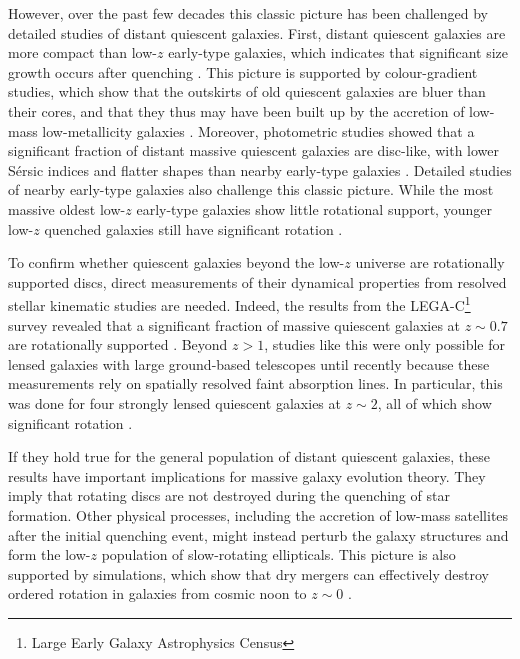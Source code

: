 \documentclass{aa}
\begin{document}
However, over the past few decades this classic picture has been challenged by detailed studies of distant quiescent galaxies. First, distant quiescent galaxies are more compact than low-$z$ early-type galaxies, which indicates that significant size growth occurs after quenching \citep[e.g.][]{EDaddi2005, PvanDokkum2008, AvanderWel2014, KSuess2021}. This picture is supported by colour-gradient studies, which show that the outskirts of old quiescent galaxies are bluer than their cores, and that they thus may have been built up by the accretion of low-mass low-metallicity galaxies \citep[e.g.][]{JGreene2015, IMartinNavarro2018, KSuess2019, Cheng_2024}. Moreover, photometric studies showed that a significant fraction of distant massive quiescent galaxies are disc-like, with lower S\'ersic indices and flatter shapes than nearby early-type galaxies \citep{EMcGrath2008, PvanDokkum2008, AvanderWel2011, RMcClure2013, VBruce2012, VBruce2014, FBuitrago2013, YChang2013a, YChang2013b}. Detailed studies of nearby early-type galaxies also challenge this classic picture. While the most massive oldest low-$z$ early-type galaxies show little rotational support, younger low-$z$ quenched galaxies still have significant rotation \citep[e.g.][]{JvandeSande2017, JVandeSande2018, SCroom2024}.

To confirm whether quiescent galaxies beyond the low-$z$ universe are rotationally supported discs, direct measurements of their dynamical properties from resolved stellar kinematic studies are needed. Indeed, the results from the LEGA-C\footnote{Large Early Galaxy Astrophysics Census} survey revealed that a significant fraction of massive quiescent galaxies at $z\sim0.7$ are rotationally supported \citep{RBezanson2018, JvanHoudt2021}. 
Beyond $z>1$, studies like this were only possible for lensed galaxies with large ground-based telescopes until recently because these measurements rely on spatially resolved faint absorption lines. In particular, this was done for four strongly lensed quiescent galaxies at $z\sim2$, all of which show significant rotation \citep{ANewman2015, ANewman2018b, SToft2017}.

If they hold true for the general population of distant quiescent galaxies, these results have important implications for massive galaxy evolution theory. They imply that rotating discs are not destroyed during the quenching of star formation. Other physical processes, including the accretion of low-mass satellites after the initial quenching event, might instead perturb the galaxy structures and form the low-$z$ population of slow-rotating ellipticals. This picture is also supported by simulations, which show that dry mergers can effectively destroy ordered rotation in galaxies from cosmic noon to $z\sim0$ \citep[e.g.][]{FBournaud2007,TNaab2009,FSchulze2018,YDubois2016,CLagos2018a,CLagos2018b,CLagos2022}.
\end{document}

